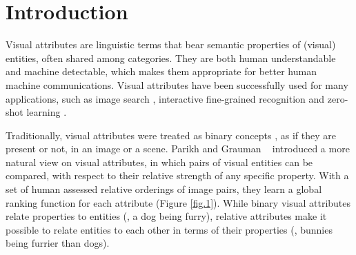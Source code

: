

\section{Introduction}

 



Visual attributes are linguistic terms that bear semantic properties of (visual) entities, often shared among categories. They are both human understandable and machine detectable, which makes them appropriate for better human machine communications. Visual attributes have been successfully used for many applications, such as image search \cite{pubfig, whittlesearch}, interactive fine-grained recognition \cite{branson10, branson13} and zero-shot learning \cite{6571196, parikh2011}.

Traditionally, visual attributes were treated as binary concepts \cite{ferrari2007learning, Farhadi09describingobjects}, as if they are present or not, in an image or a scene. Parikh and Grauman ~\cite{parikh2011} introduced a more natural view on visual attributes, in which pairs of visual entities can be compared, with respect to their relative strength of any specific property. With a set of human assessed relative orderings of image pairs, they learn a global ranking function for each attribute (Figure \ref{fig.1}).
While binary visual attributes relate properties to entities (\eg, a dog being furry), relative attributes make it possible to relate entities to each other in terms of their properties (\eg, bunnies being furrier than dogs).

